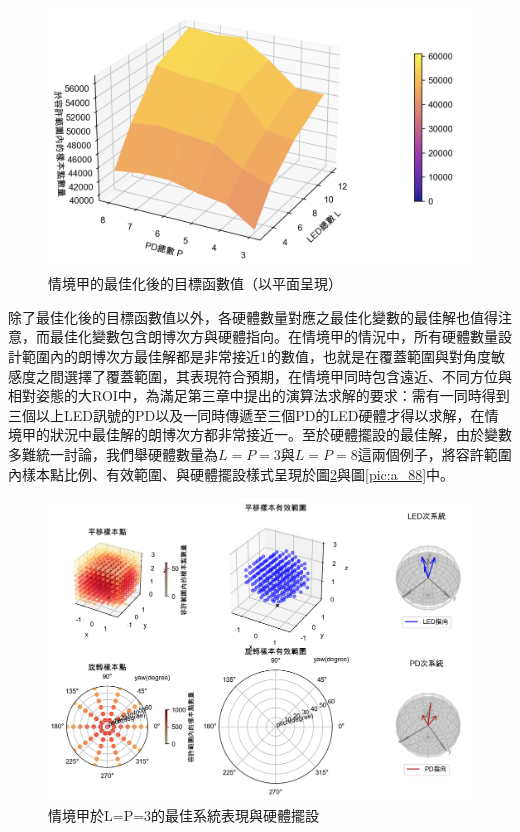     \begin{figure}[htpb]
        \centering
        \includegraphics[width=15cm]{ch5pic/surface_opt_A.png}
        \caption{情境甲的最佳化後的目標函數值（以平面呈現）}
        \label{pic:opt_A_surface}
    \end{figure}

    除了最佳化後的目標函數值以外，各硬體數量對應之最佳化變數的最佳解也值得注意，而最佳化變數包含朗博次方與硬體指向。在情境甲的情況中，所有硬體數量設計範圍內的朗博次方最佳解都是非常接近1的數值，也就是在覆蓋範圍與對角度敏感度之間選擇了覆蓋範圍，其表現符合預期，在情境甲同時包含遠近、不同方位與相對姿態的大ROI中，為滿足第三章中提出的演算法求解的要求：需有一同時得到三個以上LED訊號的PD以及一同時傳遞至三個PD的LED硬體才得以求解，在情境甲的狀況中最佳解的朗博次方都非常接近一。至於硬體擺設的最佳解，由於變數多難統一討論，我們舉硬體數量為$L=P=3$與$L=P=8$這兩個例子，將容許範圍內樣本點比例、有效範圍、與硬體擺設樣式呈現於圖\ref{pic:a_33}與圖\ref{pic:a_88}中。

    \begin{figure}[htpb]
        \centering
        \includegraphics[width=15cm]{ch5pic/a_33.png}
        \caption{情境甲於L=P=3的最佳系統表現與硬體擺設}
        \label{pic:a_33}
    \end{figure}

